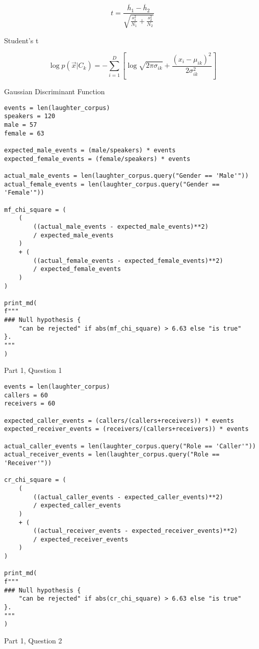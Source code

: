 \documentclass[12pt,a4paper]{article}
\begin{document}
\vspace{2cm}

\begin{listing}[h]

\[t = \frac{\overline{h}_{1}  - \overline{h}_{2}}{\sqrt{\frac{s_{1}^{2}}{N_{1}} + \frac{s_{2}^{2}}{N_{2}}}}\]
\caption{Student's t}

\end{listing}

\vspace{2cm}

\begin{listing}[h]

\[\log p\left ( \overrightarrow{x}|C_{k} \right ) = -\sum_{i=1}^{D}\left [ \log \sqrt{2\pi\sigma_{ik}} + \frac{\left ( x_{i} - \mu _{ik}  \right )^{2}}{2\sigma^{2}_{ik}} \right ]\]
\caption{Gaussian Discriminant Function}

\end{listing}

\begin{listing}[h]
\begin{verbatim}
events = len(laughter_corpus)
speakers = 120
male = 57
female = 63

expected_male_events = (male/speakers) * events
expected_female_events = (female/speakers) * events

actual_male_events = len(laughter_corpus.query("Gender == 'Male'"))
actual_female_events = len(laughter_corpus.query("Gender == 'Female'"))

mf_chi_square = (
    (
        ((actual_male_events - expected_male_events)**2)
        / expected_male_events
    )
    + (
        ((actual_female_events - expected_female_events)**2)
        / expected_female_events
    )
)

print_md(
f"""
### Null hypothesis {
    "can be rejected" if abs(mf_chi_square) > 6.63 else "is true"
}.
"""
)
\end{verbatim}
\caption{Part 1, Question 1}
\end{listing}


\begin{listing}[h]
\begin{verbatim}
events = len(laughter_corpus)
callers = 60
receivers = 60

expected_caller_events = (callers/(callers+receivers)) * events
expected_receiver_events = (receivers/(callers+receivers)) * events

actual_caller_events = len(laughter_corpus.query("Role == 'Caller'"))
actual_receiver_events = len(laughter_corpus.query("Role == 'Receiver'"))

cr_chi_square = (
    (
        ((actual_caller_events - expected_caller_events)**2)
        / expected_caller_events
    )
    + (
        ((actual_receiver_events - expected_receiver_events)**2)
        / expected_receiver_events
    )
)

print_md(
f"""
### Null hypothesis {
    "can be rejected" if abs(cr_chi_square) > 6.63 else "is true"
}.
"""
)
\end{verbatim}
\caption{Part 1, Question 2}
\end{listing}
\end{document}
